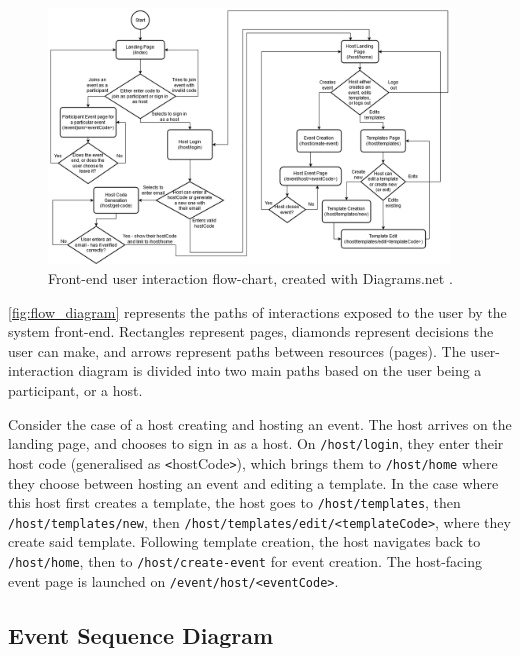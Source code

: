 \documentclass[9pt, titlepage]{extarticle}
\begin{document}
\begin{figure}[h!]
\centering
\includegraphics[width=0.95\textwidth]{assets/flow-new.png}
\caption{Front-end user interaction flow-chart, created with Diagrams.net \autocite{web:drawio}.}
\label{fig:flow_diagram}
\end{figure}

\autoref{fig:flow_diagram} represents the paths of interactions exposed to the user by the system front-end. 
Rectangles represent pages, diamonds represent decisions the user can make, and arrows represent paths between resources (pages). 
The user-interaction diagram is divided into two main paths based on the user being a participant, or a host. \newline

Consider the case of a host creating and hosting an event. The host arrives on the landing page, and chooses to sign in as a host. On \texttt{/host/login}, they enter their host code (generalised as \texttt{<}hostCode\texttt{>}), which brings them to \texttt{/host/home} where they choose between hosting an event and editing a template. In the case where this host first creates a template, the host goes to \texttt{/host/templates}, then \texttt{/host/templates/new}, then \texttt{/host/templates/edit/<templateCode>}, where they create said template. Following template creation, the host navigates back to \texttt{/host/home}, then to \texttt{/host/create-event} for event creation. The host-facing event page is launched on \texttt{/event/host/<eventCode>}.

\subsection{Event Sequence Diagram}
\end{document}
